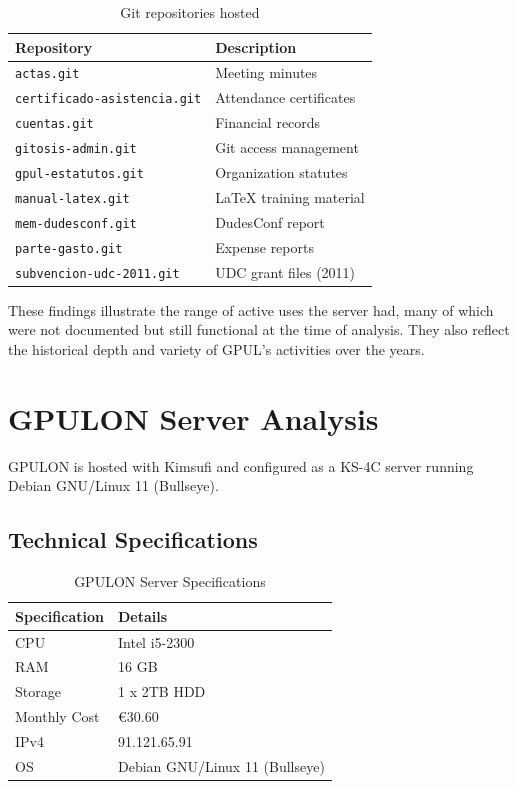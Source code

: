 \begin{table}[H]
  \centering
  \caption{Git repositories hosted}
  \label{tab:gpulino_git_repos}
  \begin{tabular}{ll}
    \rowcolor{udcpink!25}
    \textbf{Repository} & \textbf{Description} \\
    \hline
    \texttt{actas.git} & Meeting minutes \\
    \texttt{certificado-asistencia.git} & Attendance certificates \\
    \texttt{cuentas.git} & Financial records \\
    \texttt{gitosis-admin.git} & Git access management \\
    \texttt{gpul-estatutos.git} & Organization statutes \\
    \texttt{manual-latex.git} & LaTeX training material \\
    \texttt{mem-dudesconf.git} & DudesConf report \\
    \texttt{parte-gasto.git} & Expense reports \\
    \texttt{subvencion-udc-2011.git} & UDC grant files (2011) \\
  \end{tabular}
\end{table}

These findings illustrate the range of active uses the server had, many of which were not documented but still functional at the time of analysis. They also reflect the historical depth and variety of GPUL's activities over the years.

\section{GPULON Server Analysis}

GPULON is hosted with Kimsufi and configured as a KS-4C server running Debian GNU/Linux 11 (Bullseye).

\subsection*{Technical Specifications}

\begin{table}[H]
  \centering
  \caption{GPULON Server Specifications}
  \label{tab:gpulon_specs}
  \begin{tabular}{ll}
    \rowcolor{udcpink!25}
    \textbf{Specification} & \textbf{Details} \\
    \hline
    CPU & Intel i5-2300 \\
    RAM & 16 GB \\
    Storage & 1 x 2TB HDD \\
    Monthly Cost & €30.60 \\
    IPv4 & 91.121.65.91 \\
    OS & Debian GNU/Linux 11 (Bullseye) \\
  \end{tabular}
\end{table}


